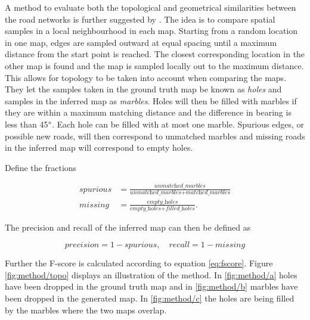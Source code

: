 A method to evaluate both the topological and geometrical similarities between the road networks is further suggested by \cite{4inBiagioni}. The idea is to compare spatial samples in a local neighbourhood in each map. Starting from a random location in one map, edges are sampled outward at equal spacing until a maximum distance from the start point is reached. The closest corresponding location in the other map is found and the map is sampled locally out to the maximum distance. This allows for topology to be taken into account when comparing the maps. They let the samples taken in the ground truth map be known as \textit{holes} and samples in the inferred map as \textit{marbles}. Holes will then be filled with marbles if they are within a maximum matching distance and the difference in bearing is less than 45$\degree$. Each hole can be filled with at most one marble. Spurious edges, or possible new roads, will then correspond to unmatched marbles and missing roads in the inferred map will correspond to empty holes. 

Define the fractions

\begin{equation}
\begin{split}
        spurious &= \frac{\textit{unmatched\_marbles}}{\textit{unmatched\_marbles} + \textit{matched\_marbles}} \\ 
        missing &= \frac{\textit{empty\_holes}}{\textit{empty\_holes} + \textit{filled\_holes}}.
\end{split}
\end{equation}

The precision and recall of the inferred map can then be defined as

\begin{equation}
    precision = 1 - spurious, \quad recall = 1 - missing
\end{equation}

Further the F-score is calculated according to equation \ref{eq:fscore}. Figure \ref{fig:method/topo} displays an illustration of the method. In \ref{fig:method/a} holes have been dropped in the ground truth map and in \ref{fig:method/b} marbles have been dropped in the generated map. In \ref{fig:method/c} the holes are being filled by the marbles where the two maps overlap.


